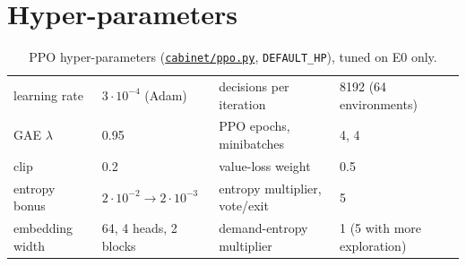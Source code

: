 \documentclass[11pt,a4paper]{article}
\newcommand{\repo}{https://github.com/bot2048/cabinet-bargaining-marl}
\newcommand{\code}[1]{\href{\repo/blob/main/#1}{\texttt{\small #1}}}
\begin{document}
\section{Hyper-parameters}\label{app:hp}
\begin{table}[H]\centering\footnotesize
\caption{PPO hyper-parameters (\code{cabinet/ppo.py}, \texttt{DEFAULT\_HP}), tuned on E0 only.}
\begin{tabular}{@{}ll@{\qquad}ll@{}}\toprule
learning rate & $3\cdot10^{-4}$ (Adam) & decisions per iteration & 8192 (64 environments)\\
GAE $\lambda$ & 0.95 & PPO epochs, minibatches & 4, 4\\
clip & 0.2 & value-loss weight & 0.5\\
entropy bonus & $2\cdot10^{-2}\to2\cdot10^{-3}$ & entropy multiplier, vote/exit & 5\\
embedding width & 64, 4 heads, 2 blocks & demand-entropy multiplier & 1 (5 with more exploration)\\
\bottomrule\end{tabular}\end{table}
\end{document}
